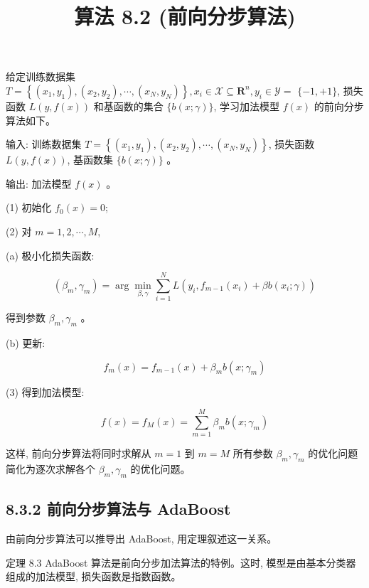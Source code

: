 \documentclass[10pt]{article}
\title{算法 8.2 (前向分步算法) }
\author{}
\date{}
\begin{document}
\maketitle
给定训练数据集 $T=\left\{\left(x_{1}, y_{1}\right),\left(x_{2}, y_{2}\right), \cdots,\left(x_{N}, y_{N}\right)\right\}, x_{i} \in \mathcal{X} \subseteq \boldsymbol{R}^{n}, y_{i} \in \mathcal{Y}=$ $\{-1,+1\}$, 损失函数 $L(y, f(x))$ 和基函数的集合 $\{b(x ; \gamma)\}$, 学习加法模型 $f(x)$ 的前向分步算法如下。

输入: 训练数据集 $T=\left\{\left(x_{1}, y_{1}\right),\left(x_{2}, y_{2}\right), \cdots,\left(x_{N}, y_{N}\right)\right\}$, 损失函数 $L(y, f(x))$, 基函数集 $\{b(x ; \gamma)\}$ 。

输出: 加法模型 $f(x)$ 。

(1) 初始化 $f_{0}(x)=0$;

(2) 对 $m=1,2, \cdots, M$,

(a) 极小化损失函数:


\begin{equation*}
\left(\beta_{m}, \gamma_{m}\right)=\arg \min _{\beta, \gamma} \sum_{i=1}^{N} L\left(y_{i}, f_{m-1}\left(x_{i}\right)+\beta b\left(x_{i} ; \gamma\right)\right) \tag{8.16}
\end{equation*}


得到参数 $\beta_{m}, \gamma_{m}$ 。

(b) 更新:


\begin{equation*}
f_{m}(x)=f_{m-1}(x)+\beta_{m} b\left(x ; \gamma_{m}\right) \tag{8.17}
\end{equation*}


(3) 得到加法模型:


\begin{equation*}
f(x)=f_{M}(x)=\sum_{m=1}^{M} \beta_{m} b\left(x ; \gamma_{m}\right) \tag{8.18}
\end{equation*}


这样, 前向分步算法将同时求解从 $m=1$ 到 $m=M$ 所有参数 $\beta_{m}, \gamma_{m}$ 的优化问题简化为逐次求解各个 $\beta_{m}, \gamma_{m}$ 的优化问题。

\subsection*{8.3.2 前向分步算法与 AdaBoost}
由前向分步算法可以推导出 AdaBoost, 用定理叙述这一关系。

定理 8.3 AdaBoost 算法是前向分步加法算法的特例。这时, 模型是由基本分类器组成的加法模型, 损失函数是指数函数。
\end{document}
